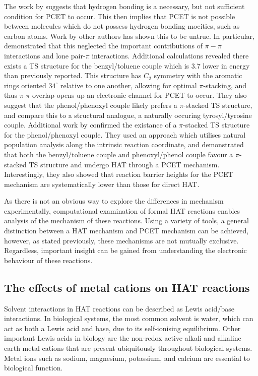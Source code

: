 The work by \citet{Mayer2002} suggests that hydrogen bonding is a necessary, but
not sufficient condition for PCET to occur. This then implies that PCET is not
possible between molecules which do not possess hydrogen bonding moeities, such
as carbon atoms. Work by other authors has shown this to be
untrue.\cite{Hatcher2007,DiLabio2007} In particular, \citet{DiLabio2007}
demonstrated that this neglected the important contributions of $\pi-\pi$
interactions and lone pair-$\pi$ interactions. Additional calculations revealed
there exists a TS structure for the benzyl/toluene couple which is 3.7 \kcalmol
lower in energy than previously reported. This structure has $C_2$ symmetry with
the aromatic rings oriented $34^\circ$ relative to one another, allowing for
optimal $\pi$-stacking, and thus $\pi$-$\pi$ overlap opens up an electronic
channel for PCET to occur. They also suggest that the phenol/phenoxyl couple
likely prefers a $\pi$-stacked TS structure, and compare this to a structural
analogue, a naturally occuring tyrosyl/tyrosine couple. Additional work by
\citet{Munoz-Rugeles2017} confirmed the existance of a $\pi$-stacked TS
structure for the phenol/phenoxyl couple. They used an approach which utilises
natural population analysis along the intrinsic reaction coordinate, and
demonstrated that both the benzyl/toluene couple and phenoxyl/phenol couple
favour a $\pi$-stacked TS structure and undergo HAT through a PCET
mechanism. Interestingly, they also showed that reaction barrier heights for the
PCET mechanism are systematically lower than those for direct HAT.\

As there is not an obvious way to explore the differences in mechanism
experimentally, computational examination of formal HAT reactions enables
analysis of the mechanism of these reactions. Using a variety of tools, a
general distinction between a HAT mechanism and PCET mechanism can be achieved,
however, as stated previously, these mechanisms are not mutually
exclusive. Regardless, important insight can be gained from understanding the
electronic behaviour of these reactions.


\subsection{The effects of metal cations on HAT reactions}

Solvent interactions in HAT reactions can be described as Lewis acid/base
interactions. In biological systems, the most common solvent is water, which can
act as both a Lewis acid and base, due to its self-ionising equilibrium. Other
important Lewis acids in biology are the non-redox active alkali and alkaline
earth metal cations that are present ubiquitously throughout biological
systems. Metal ions such as sodium, magnesium, potassium, and calcium are
essential to biological function.\cite{Karp2013} 


